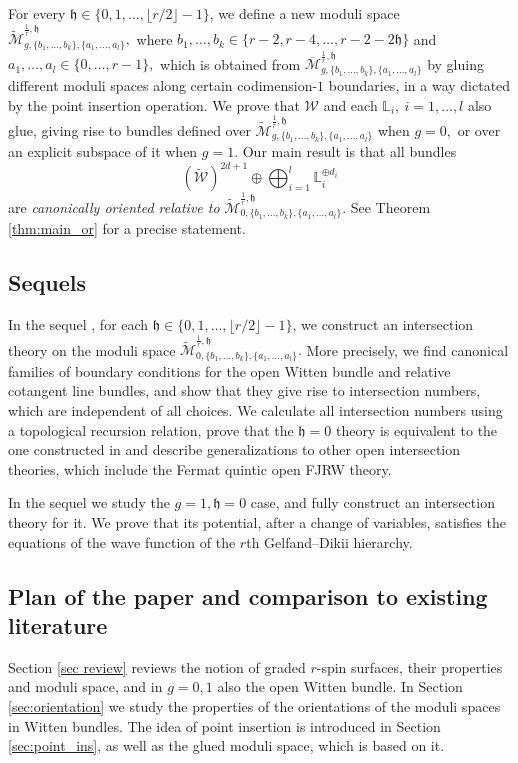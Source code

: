 \documentclass[11pt,a4paper]{article}
\theoremstyle{definition}
\theoremstyle{remark}
\numberwithin{equation}{section}
\def\h{{\mathfrak h}}
\begin{document}
For every $\h\in\{0,1,\ldots,\lfloor r/2\rfloor-1\}$, we define a new moduli space $\widetilde{\mathcal M}^{\frac{1}{r},\h}_{g,\{b_1,\ldots,b_k\},\{a_1,\ldots,a_l\}},$ where $b_1,\ldots,b_k\in\{r-2,r-4,\ldots,r-2-2\h\}$ and $a_1,\ldots,a_l\in\{0,\ldots,r-1\},$ which is obtained from $\overline{\mathcal M}^{\frac{1}{r},\h}_{g,\{b_1,\ldots,b_k\},\{a_1,\ldots,a_l\}}$ by gluing different moduli spaces along certain codimension-$1$ boundaries, in a way dictated by the point insertion operation.   We prove that ${\mathcal{W}}$ and each $\mathbb{L}_i,~i=1,\ldots, l$ also glue, giving rise to bundles defined over $\widetilde{\mathcal M}^{\frac{1}{r},\h}_{g,\{b_1,\ldots,b_k\},\{a_1,\ldots,a_l\}}$ when $g=0,$ or over an explicit subspace of it  when $g=1$.  Our main result is that all bundles
$$(\widetilde{{\mathcal{W}}})^{2d+1}\oplus\bigoplus_{i=1}^l\mathbb{L}_i^{\oplus d_i}
$$
are \emph{canonically oriented relative to }$\widetilde{\mathcal M}^{\frac{1}{r},\h}_{0,\{b_1,\ldots,b_k\},\{a_1,\ldots,a_l\}}.$ See Theorem \ref{thm:main_or} for a precise statement.

\subsection{Sequels}
In the sequel \cite{TZ2}, for each $\h\in\{0,1,\ldots,\lfloor r/2\rfloor-1\}$, we construct an intersection theory on the moduli space $\widetilde{\mathcal M}^{\frac{1}{r},\h}_{0,\{b_1,\ldots,b_k\},\{a_1,\ldots,a_l\}}.$ More precisely, we find canonical families of boundary conditions for the open Witten bundle and relative cotangent line bundles, and show that they give rise to intersection numbers, which are independent of all choices. 
We calculate all intersection numbers using a topological recursion relation, prove that the $\h=0$ theory is equivalent to the one constructed in \cite{BCT1,BCT2} and describe generalizations to other open intersection theories, which include the Fermat quintic open FJRW theory.

{In the sequel \cite{TZ3} we study the $g=1,\h=0$ case, and fully construct an intersection theory for it. We prove that its potential, after a change of variables, satisfies the equations of the wave function of the $r$th Gelfand--Dikii hierarchy.}

\subsection{Plan of the paper and comparison to existing literature}
Section \ref{sec review} reviews the notion of graded $r$-spin surfaces, their properties and moduli space, and in $g=0,1$ also the open Witten bundle. In Section \ref{sec:orientation} we study the properties of the orientations of the moduli spaces in Witten bundles. The idea of point insertion is introduced in Section \ref{sec:point_ins}, as well as the glued moduli space, which is based on it.
\end{document}
